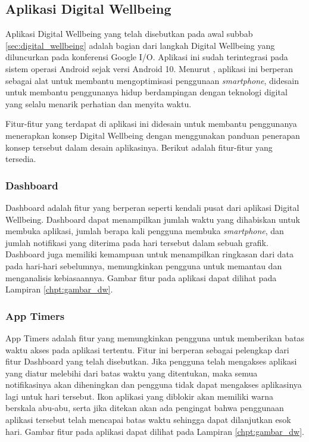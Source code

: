 \subsection{Aplikasi Digital Wellbeing}

Aplikasi Digital Wellbeing yang telah disebutkan pada awal subbab \ref{sec:digital_wellbeing} adalah bagian dari langkah Digital Wellbeing yang diluncurkan pada konferensi Google I/O. Aplikasi ini sudah terintegrasi pada sistem operasi Android sejak versi Android 10. \parencite{google2021dwsupport} Menurut \textcite{8976353}, aplikasi ini berperan sebagai alat untuk membantu mengoptimisasi penggunaan \textit{smartphone}, didesain untuk membantu penggunanya hidup berdampingan dengan teknologi digital yang selalu menarik perhatian dan menyita waktu.

Fitur-fitur yang terdapat di aplikasi ini didesain untuk membantu penggunanya menerapkan konsep Digital Wellbeing dengan menggunakan panduan penerapan konsep tersebut dalam desain aplikasinya. Berikut adalah fitur-fitur yang tersedia.



\subsubsection{Dashboard}
Dashboard adalah fitur yang berperan seperti kendali pusat dari aplikasi Digital Wellbeing. Dashboard dapat menampilkan jumlah waktu yang dihabiskan untuk membuka aplikasi, jumlah berapa kali pengguna membuka \textit{smartphone}, dan jumlah notifikasi yang diterima pada hari tersebut dalam sebuah grafik. \parencite{android2019digitalwellbeing} Dashboard juga memiliki kemampuan untuk menampilkan ringkasan dari data pada hari-hari sebelumnya, memungkinkan pengguna untuk memantau dan menganalisis kebiasaannya. Gambar fitur pada aplikasi dapat dilihat pada Lampiran \ref{chpt:gambar_dw}.

\subsubsection{App Timers}
App Timers adalah fitur yang memungkinkan pengguna untuk memberikan batas waktu akses pada aplikasi tertentu. Fitur ini berperan sebagai pelengkap dari fitur Dashboard yang telah disebutkan. Jika pengguna telah mengakses aplikasi yang diatur melebihi dari batas waktu yang ditentukan, maka semua notifikasinya akan diheningkan dan pengguna tidak dapat mengakses aplikasinya lagi untuk hari tersebut. \parencite{android2019digitalwellbeing} Ikon aplikasi yang diblokir akan memiliki warna berskala abu-abu, serta jika ditekan akan ada pengingat bahwa penggunaan aplikasi tersebut telah mencapai batas waktu sehingga dapat dilanjutkan esok hari. Gambar fitur pada aplikasi dapat dilihat pada Lampiran \ref{chpt:gambar_dw}.

